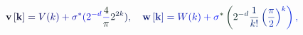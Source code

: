\documentclass[12pt]{article}
\begin{document}
\makeatletter
\renewcommand*{\@textcolor}[3]{%
  \protect\leavevmode
  \begingroup
    \color#1{#2}#3%
  \endgroup
}
\makeatother
\begin{displaymath}
\mathbf { \mathcolor[RGB]{0,0,15}{v} } \mathcolor[RGB]{0,0,30}{\left[} \mathbf { \mathcolor[RGB]{0,0,45}{k} } \mathcolor[RGB]{0,0,60}{\right]} \mathcolor[RGB]{0,0,75}{=} \mathcolor[RGB]{0,0,90}{V} \mathcolor[RGB]{0,0,105}{(} \mathcolor[RGB]{0,0,120}{k} \mathcolor[RGB]{0,0,135}{)} \mathcolor[RGB]{0,0,150}{+} \mathbf { \mathcolor[RGB]{0,0,165}{\sigma} } ^ { \mathcolor[RGB]{0,0,180}{*} } \mathcolor[RGB]{0,0,195}{(} \mathcolor[RGB]{0,0,210}{2} ^ { \mathcolor[RGB]{0,0,225}{-} \mathcolor[RGB]{0,0,240}{d} } \mathcolor[RGB]{0,0,255}{\frac { \mathcolor[RGB]{0,15,0}{4} } { \mathcolor[RGB]{0,15,15}{\pi} } } \mathcolor[RGB]{0,15,30}{2} ^ { \mathcolor[RGB]{0,15,45}{2} \mathcolor[RGB]{0,15,60}{k} } \mathcolor[RGB]{0,15,75}{)} \mathcolor[RGB]{0,15,90}{,} \quad \mathbf { \mathcolor[RGB]{0,15,105}{w} } \mathcolor[RGB]{0,15,120}{\left[} \mathbf { \mathcolor[RGB]{0,15,135}{k} } \mathcolor[RGB]{0,15,150}{\right]} \mathcolor[RGB]{0,15,165}{=} \mathcolor[RGB]{0,15,180}{W} \mathcolor[RGB]{0,15,195}{(} \mathcolor[RGB]{0,15,210}{k} \mathcolor[RGB]{0,15,225}{)} \mathcolor[RGB]{0,15,240}{+} \mathbf { \mathcolor[RGB]{0,15,255}{\sigma} } ^ { \mathcolor[RGB]{0,30,0}{*} } \mathcolor[RGB]{0,30,15}{\left(} \mathcolor[RGB]{0,30,30}{2} ^ { \mathcolor[RGB]{0,30,45}{-} \mathcolor[RGB]{0,30,60}{d} } \mathcolor[RGB]{0,30,75}{\frac { \mathcolor[RGB]{0,30,90}{1} } { \mathcolor[RGB]{0,30,105}{k} \mathcolor[RGB]{0,30,120}{!} } } \mathcolor[RGB]{0,30,135}{\left(} \mathcolor[RGB]{0,30,150}{\frac { \mathcolor[RGB]{0,30,165}{\pi} } { \mathcolor[RGB]{0,30,180}{2} } } \mathcolor[RGB]{0,30,195}{\right)} ^ { \mathcolor[RGB]{0,30,210}{k} } \mathcolor[RGB]{0,30,225}{\right)} \mathcolor[RGB]{0,30,240}{,}
\end{displaymath}
\end{document}

